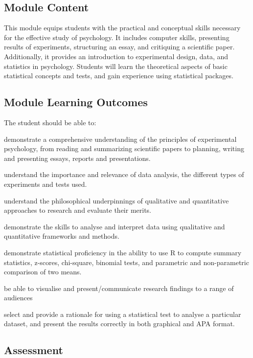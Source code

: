 \documentclass[
  11pt,
  letterpaper,
  oneside,
  open=any]{scrbook}
\begin{document}
\hypertarget{module-content}{%
\subsection{Module Content}\label{module-content}}

This module equips students with the practical and conceptual skills
necessary for the effective study of psychology. It includes computer
skills, presenting results of experiments, structuring an essay, and
critiquing a scientific paper. Additionally, it provides an introduction
to experimental design, data, and statistics in psychology. Students
will learn the theoretical aspects of basic statistical concepts and
tests, and gain experience using statistical packages.

\hypertarget{module-learning-outcomes}{%
\subsection{Module Learning Outcomes}\label{module-learning-outcomes}}

The student should be able to:

demonstrate a comprehensive understanding of the principles of
experimental psychology, from reading and summarizing scientific papers
to planning, writing and presenting essays, reports and presentations.

understand the importance and relevance of data analysis, the different
types of experiments and tests used.

understand the philosophical underpinnings of qualitative and
quantitative approaches to research and evaluate their merits.

demonstrate the skills to analyse and interpret data using qualitative
and quantitative frameworks and methods.

demonstrate statistical proficiency in the ability to use R to compute
summary statistics, z-scores, chi-square, binomial tests, and parametric
and non-parametric comparison of two means.

be able to visualise and present/communicate research findings to a
range of audiences

select and provide a rationale for using a statistical test to analyse a
particular dataset, and present the results correctly in both graphical
and APA format.

\hypertarget{assessment}{%
\subsection{Assessment}\label{assessment}}
\end{document}
